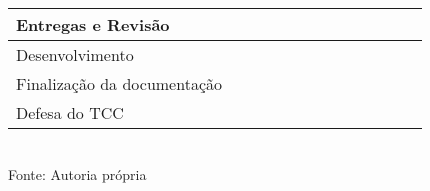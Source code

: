 \begin{quadro}[H]
\begin{center}
\begin{tabular}{|m{6.5cm}|m{.2cm}|m{.2cm}|m{.2cm}|m{.2cm}|m{.2cm}|m{.2cm}|m{.2cm}|m{.2cm}|m{.2cm}|m{.2cm}|m{.2cm}|m{.2cm}|}
			Entregas e Revisão  &   &   &  & & \cellcolor{gray!50} & \cellcolor{gray!50}   & & & & & &\\
			\hline
			Desenvolvimento & & & & & & & \cellcolor{gray!50} & \cellcolor{gray!50}   & \cellcolor{gray!50} & \cellcolor{gray!50}   & \cellcolor{gray!50} &\\
			\hline
			Finalização da documentação  & & & & & & & & & & \cellcolor{gray!50} & \cellcolor{gray!50} &\\
			\hline
			Defesa do TCC  & & & & & & & & & & & & \cellcolor{gray!50}\\
			\hline
		\end{tabular}
		\vspace{0.5cm}	\\Fonte: Autoria própria
	\end{center}
\end{quadro}